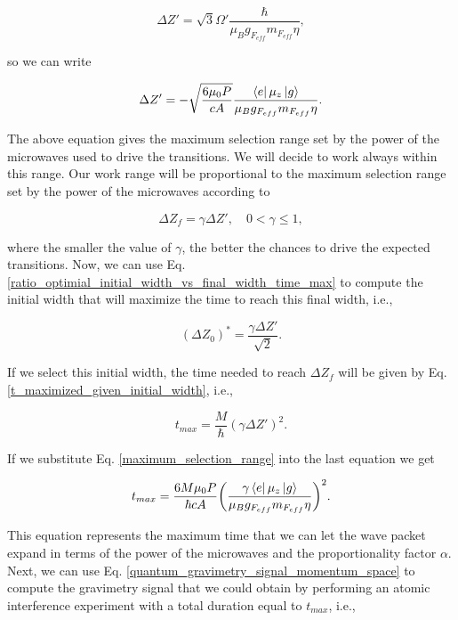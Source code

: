\documentclass{article}
\begin{document}
\begin{equation*}
\Delta Z' = \sqrt{3} \Omega' \frac{\hbar}{\mu_{B} g_{F_{eff}} m_{F_{eff}} \eta},
\end{equation*}

so we can write

\begin{equation}\label{maximum_selection_range}
\Delta Z' = - \sqrt{\frac{6 \mu_{0} P}{c A}} \frac{\bra{e} \mu_{z} \ket{g}}{\mu_{B} g_{F_{eff}} m_{F_{eff}} \eta}.
\end{equation}

The above equation gives the maximum selection range set by the power of the microwaves used to drive the transitions. We will decide to work always within this range. Our work range will be proportional to the maximum selection range set by the power of the microwaves according to

\begin{equation}
    \Delta Z_{f} = \gamma \Delta Z' \mathrm{,} \quad 0 < \gamma \leq 1,
\end{equation}

where the smaller the value of $\gamma$, the better the chances to drive the expected transitions. Now, we can use Eq. \ref{ratio_optimial_initial_width_vs_final_width_time_max} to compute the initial width that will maximize the time to reach this final width, i.e.,

\begin{equation}
    (\Delta Z_{0})^{\ast} = \frac{\gamma \Delta Z'}{\sqrt{2}}.
\end{equation}

If we select this initial width, the time needed to reach $\Delta Z_{f}$ will be given by Eq. \ref{t_maximized_given_initial_width}, i.e.,

\begin{equation}
    t_{max} = \frac{M}{\hbar} (\gamma \Delta Z')^2.
\end{equation}

If we substitute Eq. \ref{maximum_selection_range} into the last equation we get

\begin{equation}\label{total_experiment_time}
    t_{max} = \frac{6 M \mu_{0} P}{\hbar c A} \bigg(\frac{ \gamma  \bra{e} \mu_{z} \ket{g}}{\mu_{B} g_{F_{eff}} m_{F_{eff}} \eta}\bigg)^{2}.
\end{equation}

This equation represents the maximum time that we can let the wave packet expand in terms of the power of the microwaves and the proportionality factor $\alpha$. Next, we can use Eq. \ref{quantum_gravimetry_signal_momentum_space} to compute the gravimetry signal that we could obtain by performing an atomic interference experiment with a total duration equal to $t_{max}$, i.e., 
\end{document}
